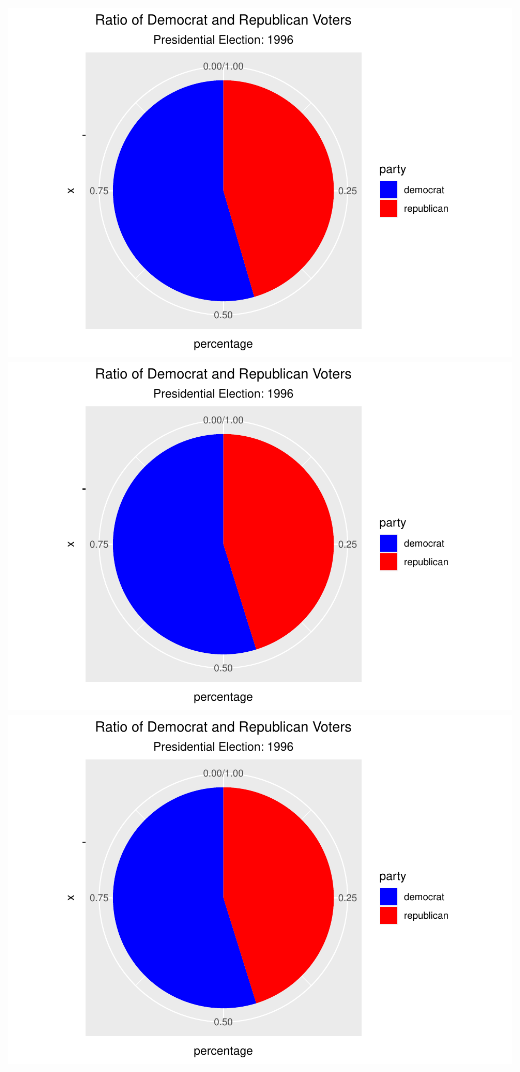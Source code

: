 \documentclass[
]{article}
\begin{document}
\includegraphics{election_files/figure-latex/anim-46.pdf}
\includegraphics{election_files/figure-latex/anim-47.pdf}
\includegraphics{election_files/figure-latex/anim-48.pdf}
\end{document}
